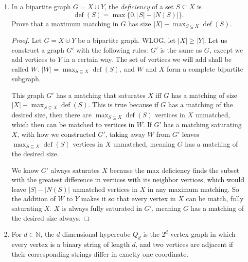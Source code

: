 \documentclass[12pt]{article}
\begin{document}
\begin{enumerate}
\medskip 
\item In a bipartite graph $G = X \cupdot Y$, the {\em deficiency} of a set $S \subseteq X$ is \[\operatorname{def}(S) = \max\{0, |S| - |N(S)|\}.\] Prove that a maximum matching in $G$ has size $|X| - \max_{S \subseteq X} \operatorname{def}(S)$.
\begin{proof}
	Let $G = X \cupdot Y$ be a bipartite graph. WLOG, let $|X|\geq |Y|$. Let us construct a graph $G'$ with the following rules: $G'$ is the same as $G$, except we add vertices to $Y$ in a certain way. The set of vertices we will add shall be called $W$. $|W| = \max_{S \subseteq X} \operatorname{def}(S)$, and $W$ and $X$ form a complete bipartite subgraph.\par
	This graph $G'$ has a matching that saturates $X$ iff $G$ has a matching of size $|X| - \max_{S \subseteq X} \operatorname{def}(S)$. This is true because if $G$ has a matching of the desired size, then there are $\max_{S \subseteq X} \operatorname{def}(S)$ vertices in $X$ unmatched, which then can be matched to vertices in $W$. If $G'$ has a matching saturating $X$, with how we constructed $G'$, taking away $W$ from $G'$ leaves $\max_{S \subseteq X} \operatorname{def}(S)$ vertices in $X$ unmatched, meaning $G$ has a matching of the desired size.\par
	We know $G'$ always saturates $X$ because the max deficiency finds the subset with the greatest difference in vertices with its neighbor vertices, which would leave $|S| - |N(S)|$ unmatched vertices in $X$ in any maximum matching. So the addition of $W$ to $Y$ makes it so that every vertex in $X$ can be match, fully saturating $X$. \Therefore $X$ is always fully saturated in $G'$, meaning $G$ has a matching of the desired size always.
\end{proof}


\medskip

\item For $d \in \mathbb N$, the $d$-dimensional hypercube $Q_d$ is the $2^d$-vertex graph in which every vertex is a binary string of length $d$, and two vertices are adjacent if their corresponding strings differ in exactly one coordinate. 


\end{enumerate}
\end{document}
